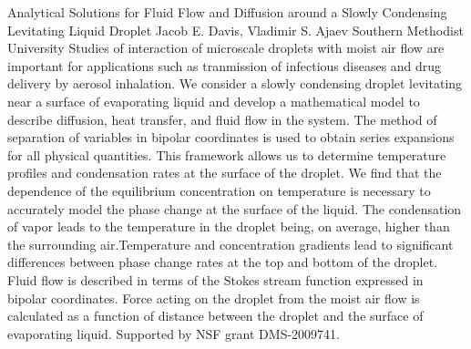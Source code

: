 \begin{addmargin}[2em]{0em}
\vspace{1.5ex}
\abs
{Analytical Solutions for Fluid Flow and Diffusion around a Slowly Condensing Levitating Liquid Droplet}
{Jacob E. Davis, Vladimir S. Ajaev}
{Southern Methodist University}
{Studies of interaction of microscale droplets with moist air flow are important for applications such as tranmission of infectious diseases and drug delivery by aerosol inhalation. We consider a slowly condensing droplet levitating near a surface of evaporating liquid and develop a mathematical model to describe diffusion, heat transfer, and fluid flow in the system. The method of separation of variables in bipolar coordinates is used to obtain series expansions for all physical quantities. This framework allows us to determine temperature profiles and condensation rates at the surface of the droplet. We find that the dependence of the equilibrium concentration on temperature is necessary to accurately model the phase change at the surface of the liquid. The condensation of vapor leads to the temperature in the droplet being, on average, higher than the surrounding air.Temperature and concentration gradients lead to significant differences between phase change rates at the top and bottom of the droplet. Fluid flow is described in terms of the Stokes stream function expressed in bipolar coordinates. Force acting on the droplet from the moist air flow is calculated as a function of distance between the droplet and the surface of evaporating liquid. Supported by NSF grant DMS-2009741.}



\end{addmargin}
